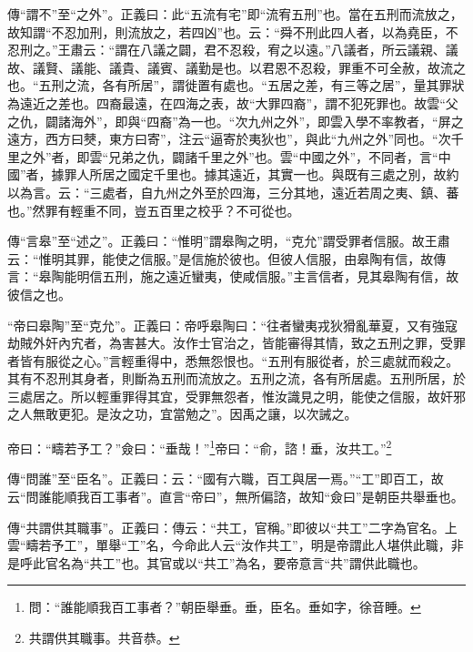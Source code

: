 {\noindent\zhuan{}\fzbyks 傳“謂不”至“之外”。正義曰：此“五流有宅”即“流宥五刑”也。當在五刑而流放之，故知謂“不忍加刑，則流放之，若四凶”也。云：“舜不刑此四人者，以為堯臣，不忍刑之。”王肅云：“謂在八議之闢，君不忍殺，宥之以遠。”八議者，所云議親、議故、議賢、議能、議貴、議賓、議勤是也。以君恩不忍殺，罪重不可全赦，故流之也。“五刑之流，各有所居”，謂徙置有處也。“五居之差，有三等之居”，量其罪狀為遠近之差也。四裔最遠，在四海之表，故“大罪四裔”，謂不犯死罪也。故雲“父之仇，闢諸海外”，即與“四裔”為一也。“次九州之外”，即雲入學不率教者，“屏之遠方，西方曰僰，東方曰寄”，注云“逼寄於夷狄也”，與此“九州之外”同也。“次千里之外”者，即雲“兄弟之仇，闢諸千里之外”也。雲“中國之外”，不同者，言“中國”者，據罪人所居之國定千里也。據其遠近，其實一也。與既有三處之別，故約以為言。云：“三處者，自九州之外至於四海，三分其地，遠近若周之夷、鎮、蕃也。”然罪有輕重不同，豈五百里之校乎？不可從也。 \par}

{\noindent\zhuan{}\fzbyks 傳“言皋”至“述之”。正義曰：“惟明”謂皋陶之明，“克允”謂受罪者信服。故王肅云：“惟明其罪，能使之信服。”是信施於彼也。但彼人信服，由皋陶有信，故傳言：“皋陶能明信五刑，施之遠近蠻夷，使咸信服。”主言信者，見其皋陶有信，故彼信之也。 \par}

{\noindent\shu{}\fzkt “帝曰皋陶”至“克允”。正義曰：帝呼皋陶曰：“往者蠻夷戎狄猾亂華夏，又有強寇劫賊外奸內宄者，為害甚大。汝作士官治之，皆能審得其情，致之五刑之罪，受罪者皆有服從之心。”言輕重得中，悉無怨恨也。“五刑有服從者，於三處就而殺之。其有不忍刑其身者，則斷為五刑而流放之。五刑之流，各有所居處。五刑所居，於三處居之。所以輕重罪得其宜，受罪無怨者，惟汝識見之明，能使之信服，故奸邪之人無敢更犯。是汝之功，宜當勉之”。因禹之讓，以次誡之。 \par}

帝曰：“疇若予工？”僉曰：“垂哉！”\footnote{問：“誰能順我百工事者？”朝臣舉垂。垂，臣名。垂如字，徐音睡。}帝曰：“俞，諮！垂，汝共工。”\footnote{共謂供其職事。共音恭。}

{\noindent\zhuan{}\fzbyks 傳“問誰”至“臣名”。正義曰：云：“國有六職，百工與居一焉。”“工”即百工，故云“問誰能順我百工事者”。直言“帝曰”，無所偏諮，故知“僉曰”是朝臣共舉垂也。 \par}

{\noindent\zhuan{}\fzbyks 傳“共謂供其職事”。正義曰：傳云：“共工，官稱。”即彼以“共工”二字為官名。上雲“疇若予工”，單舉“工”名，今命此人云“汝作共工”，明是帝謂此人堪供此職，非是呼此官名為“共工”也。其官或以“共工”為名，要帝意言“共”謂供此職也。 \par}

